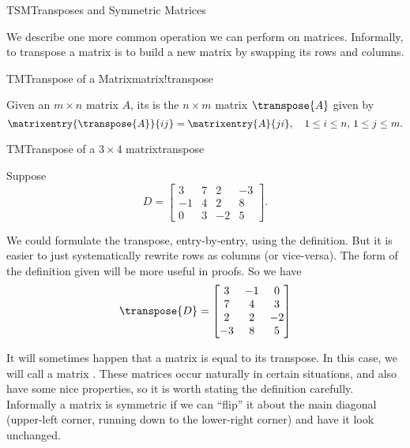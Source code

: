 \begin{subsect}{TSM}{Transposes and Symmetric Matrices}
%
\begin{para}We describe one more common operation we can perform on matrices.  Informally, to transpose a matrix is to build a new matrix by swapping its rows and columns.\end{para}
%
\begin{definition}{TM}{Transpose of a Matrix}{matrix!transpose}
\begin{para}Given an $m\times n$ matrix $A$, its  is the $n\times m$ matrix $\transpose{A}$ given by
%
\begin{equation*}
\matrixentry{\transpose{A}}{ij}=\matrixentry{A}{ji},\quad 1\leq i\leq n,\,1\leq j\leq m.
\end{equation*}
\end{para}
%
\end{definition}
%
\begin{example}{TM}{Transpose of a $3\times 4$ matrix}{transpose}
\begin{para}Suppose
%
\begin{equation*}
D=
\begin{bmatrix}
3&7&2&-3\\
-1&4&2&8\\
0&3&-2&5
\end{bmatrix}.
\end{equation*}\end{para}
%
\begin{para}We could formulate the transpose, entry-by-entry, using the definition.  But it is easier to just systematically rewrite rows as columns (or vice-versa).  The form of the definition given will be more useful in proofs.  So we have
%
\begin{equation*}
\transpose{D}=
\begin{bmatrix}
3&-1&0\\
7&4&3\\
2&2&-2\\
-3&8&5
\end{bmatrix}
\end{equation*}
\end{para}
%
\end{example}
%
\begin{para}It will sometimes happen that a matrix is equal to its transpose.  In this case, we will call a matrix .  These matrices occur naturally in certain situations, and also have some nice properties, so it is worth stating the definition carefully.  Informally a matrix is symmetric if we can ``flip'' it about the main diagonal (upper-left corner, running down to the lower-right corner) and have it look unchanged.\end{para}

\end{subsect}
